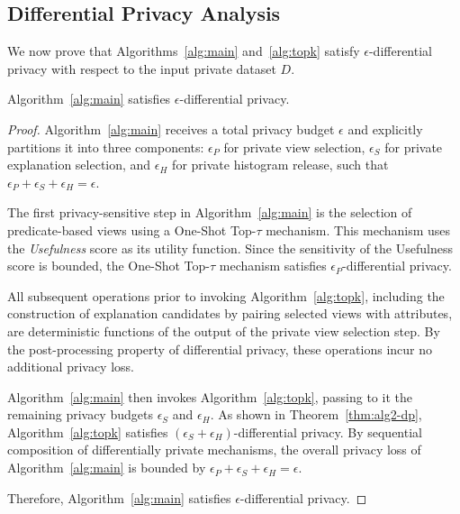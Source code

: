\subsection{Differential Privacy Analysis}
\label{subsec:dp-proof}

We now prove that Algorithms~\ref{alg:main} and~\ref{alg:topk} satisfy $\epsilon$-differential privacy with respect to the input private dataset $D$.

\begin{proposition}
\label{thm:alg1-dp}
Algorithm~\ref{alg:main} satisfies $\epsilon$-differential privacy.
\end{proposition}

\begin{proof}
Algorithm~\ref{alg:main} receives a total privacy budget $\epsilon$ and explicitly partitions it into three components:
$\epsilon_P$ for private view selection,
$\epsilon_S$ for private explanation selection,
and $\epsilon_H$ for private histogram release,
such that $\epsilon_P + \epsilon_S + \epsilon_H = \epsilon$.

The first privacy-sensitive step in Algorithm~\ref{alg:main} is the selection of predicate-based views using a One-Shot Top-$\tau$ mechanism. This mechanism uses the \emph{Usefulness} score as its utility function. Since the sensitivity of the Usefulness score is bounded, the One-Shot Top-$\tau$ mechanism satisfies $\epsilon_P$-differential privacy.

All subsequent operations prior to invoking Algorithm~\ref{alg:topk}, including the construction of explanation candidates by pairing selected views with attributes, are deterministic functions of the output of the private view selection step. By the post-processing property of differential privacy, these operations incur no additional privacy loss.

Algorithm~\ref{alg:main} then invokes Algorithm~\ref{alg:topk}, passing to it the remaining privacy budgets $\epsilon_S$ and $\epsilon_H$. As shown in Theorem~\ref{thm:alg2-dp}, Algorithm~\ref{alg:topk} satisfies $(\epsilon_S + \epsilon_H)$-differential privacy. By sequential composition of differentially private mechanisms, the overall privacy loss of Algorithm~\ref{alg:main} is bounded by
$\epsilon_P + \epsilon_S + \epsilon_H = \epsilon$.

Therefore, Algorithm~\ref{alg:main} satisfies $\epsilon$-differential privacy.
\end{proof}

